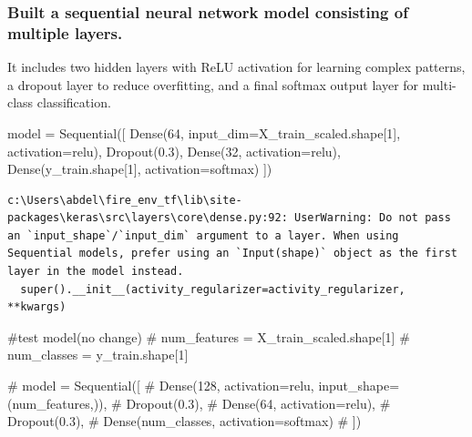 \documentclass[
  letterpaper,
  DIV=11,
  numbers=noendperiod]{scrartcl}
\newenvironment{Shaded}{\begin{snugshade}}{\end{snugshade}}
\newcommand{\CommentTok}[1]{\textcolor[rgb]{0.37,0.37,0.37}{#1}}
\newcommand{\DecValTok}[1]{\textcolor[rgb]{0.68,0.00,0.00}{#1}}
\newcommand{\FloatTok}[1]{\textcolor[rgb]{0.68,0.00,0.00}{#1}}
\newcommand{\NormalTok}[1]{\textcolor[rgb]{0.00,0.23,0.31}{#1}}
\newcommand{\OperatorTok}[1]{\textcolor[rgb]{0.37,0.37,0.37}{#1}}
\newcommand{\StringTok}[1]{\textcolor[rgb]{0.13,0.47,0.30}{#1}}
\begin{document}
\subsubsection{Built a sequential neural network model consisting of
multiple
layers.}\label{built-a-sequential-neural-network-model-consisting-of-multiple-layers.}

It includes two hidden layers with ReLU activation for learning complex
patterns, a dropout layer to reduce overfitting, and a final softmax
output layer for multi-class classification.

\begin{Shaded}
\begin{Highlighting}[]
\NormalTok{model }\OperatorTok{=}\NormalTok{ Sequential([}
\NormalTok{    Dense(}\DecValTok{64}\NormalTok{, input\_dim}\OperatorTok{=}\NormalTok{X\_train\_scaled.shape[}\DecValTok{1}\NormalTok{], activation}\OperatorTok{=}\StringTok{\textquotesingle{}relu\textquotesingle{}}\NormalTok{),}
\NormalTok{    Dropout(}\FloatTok{0.3}\NormalTok{),}
\NormalTok{    Dense(}\DecValTok{32}\NormalTok{, activation}\OperatorTok{=}\StringTok{\textquotesingle{}relu\textquotesingle{}}\NormalTok{),}
\NormalTok{    Dense(y\_train.shape[}\DecValTok{1}\NormalTok{], activation}\OperatorTok{=}\StringTok{\textquotesingle{}softmax\textquotesingle{}}\NormalTok{)  }
\NormalTok{])}
\end{Highlighting}
\end{Shaded}

\begin{verbatim}
c:\Users\abdel\fire_env_tf\lib\site-packages\keras\src\layers\core\dense.py:92: UserWarning: Do not pass an `input_shape`/`input_dim` argument to a layer. When using Sequential models, prefer using an `Input(shape)` object as the first layer in the model instead.
  super().__init__(activity_regularizer=activity_regularizer, **kwargs)
\end{verbatim}

\begin{Shaded}
\begin{Highlighting}[]
\CommentTok{\#test model(no change)}
\CommentTok{\# num\_features = X\_train\_scaled.shape[1]}
\CommentTok{\# num\_classes = y\_train.shape[1]  }

\CommentTok{\# model = Sequential([}
\CommentTok{\#     Dense(128, activation=\textquotesingle{}relu\textquotesingle{}, input\_shape=(num\_features,)),}
\CommentTok{\#     Dropout(0.3),}
\CommentTok{\#     Dense(64, activation=\textquotesingle{}relu\textquotesingle{}),}
\CommentTok{\#     Dropout(0.3),}
\CommentTok{\#     Dense(num\_classes, activation=\textquotesingle{}softmax\textquotesingle{})}
\CommentTok{\# ])}
\end{Highlighting}
\end{Shaded}
\end{document}
